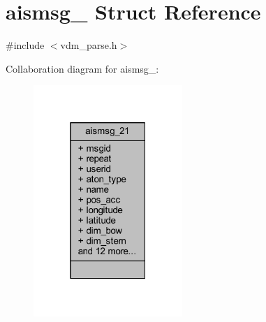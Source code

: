 \hypertarget{structaismsg__21}{}\section{aismsg\+\_ Struct Reference}
\label{structaismsg__21}


{\ttfamily \#include $<$vdm\+\_\+parse.\+h$>$}



Collaboration diagram for aismsg\+\_\+:
\nopagebreak
\begin{figure}[H]
\begin{center}
\leavevmode
\includegraphics[width=160pt]{structaismsg__21__coll__graph}
\end{center}
\end{figure}
